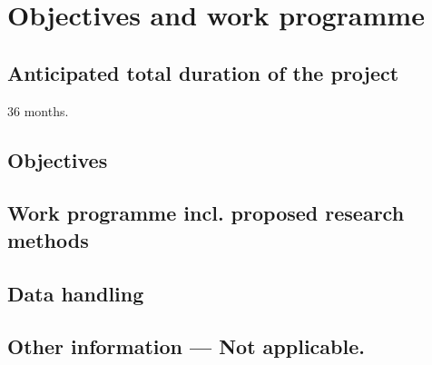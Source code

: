 \documentclass{dfg_en}
\newcounter{objectives}
\newcommand*{\addtopatangemeldet}[1]{\addtocategory{patente-angemeldet}{#1}\nocite{#1}}
\newcommand*{\addtopatakzeptiert}[1]{\addtocategory{patente-akzeptiert}{#1}\nocite{#1}}
\newcommand{\emptyheading}{ \mdseries--- Not applicable.}
\begin{document}

%

%


\section{Objectives and work programme}

\subsection{Anticipated total duration of the project}
36 months.

\subsection{Objectives}\label{sec:objectives}


\subsection{Work programme incl. proposed research methods}


\subsection{Data handling}


\subsection{Other information\emptyheading}
\end{document}
